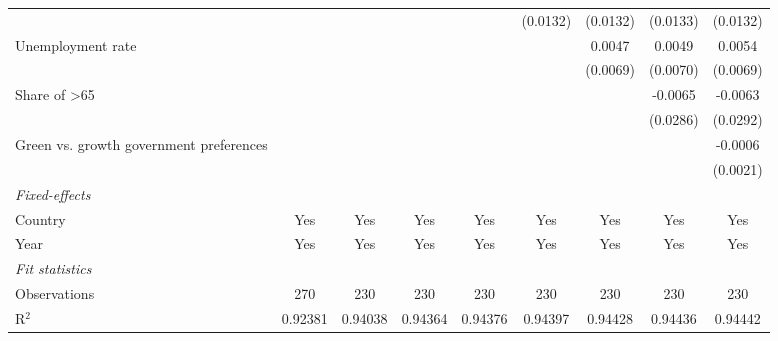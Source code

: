 \begin{table}[htbp]
\begin{tabular}{lcccccccc}
                                                                      &          &          &                 &                 & (0.0132)        & (0.0132)        & (0.0133)        & (0.0132)\\   
      Unemployment rate                                               &          &          &                 &                 &                 & 0.0047          & 0.0049          & 0.0054\\   
                                                                      &          &          &                 &                 &                 & (0.0069)        & (0.0070)        & (0.0069)\\   
      Share of >65                                                    &          &          &                 &                 &                 &                 & -0.0065         & -0.0063\\   
                                                                      &          &          &                 &                 &                 &                 & (0.0286)        & (0.0292)\\   
      Green vs. growth government preferences                         &          &          &                 &                 &                 &                 &                 & -0.0006\\   
                                                                      &          &          &                 &                 &                 &                 &                 & (0.0021)\\   
      \midrule
      \emph{Fixed-effects}\\
      Country                                                         & Yes      & Yes      & Yes             & Yes             & Yes             & Yes             & Yes             & Yes\\  
      Year                                                            & Yes      & Yes      & Yes             & Yes             & Yes             & Yes             & Yes             & Yes\\  
      \midrule
      \emph{Fit statistics}\\
      Observations                                                    & 270      & 230      & 230             & 230             & 230             & 230             & 230             & 230\\  
      R$^2$                                                           & 0.92381  & 0.94038  & 0.94364         & 0.94376         & 0.94397         & 0.94428         & 0.94436         & 0.94442\\  

\end{tabular}
\end{table}
